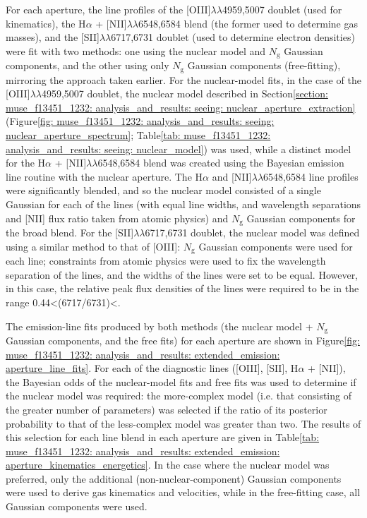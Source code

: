 For each aperture, the line profiles of the [OIII]$\lambda\lambda$4959,5007 doublet (used for kinematics), the H$\alpha$ + {[}NII{]}$\lambda\lambda$6548,6584 blend (the former used to determine gas masses), and the {[}SII{]}$\lambda\lambda$6717,6731 doublet (used to determine electron densities) were fit with two methods: one using the nuclear model and $N_\mathrm{g}$ Gaussian components, and the other using only $N_\mathrm{g}$ Gaussian components (free-fitting), mirroring the approach taken earlier. For the nuclear-model fits, in the case of the [OIII]$\lambda\lambda$4959,5007 doublet, the nuclear model described in Section\;\ref{section: muse_f13451_1232: analysis_and_results: seeing: nuclear_aperture_extraction} (Figure\;\ref{fig: muse_f13451_1232: analysis_and_results: seeing: nuclear_aperture_spectrum}; Table\;\ref{tab: muse_f13451_1232: analysis_and_results: seeing: nuclear_model}) was used, while a distinct model for the H$\alpha$ + {[}NII{]}$\lambda\lambda$6548,6584 blend was created using the Bayesian emission line routine with the nuclear aperture. The H$\alpha$ and {[}NII{]}$\lambda\lambda$6548,6584 line profiles were significantly blended, and so the nuclear model consisted of a single Gaussian for each of the lines (with equal line widths, and wavelength separations and [NII] flux ratio taken from atomic physics) and $N_\mathrm{g}$ Gaussian components for the broad blend. For the {[}SII{]}$\lambda\lambda$6717,6731 doublet, the nuclear model was defined using a similar method to that of [OIII]: $N_\mathrm{g}$ Gaussian components were used for each line; constraints from atomic physics \citep{Osterbrock2006} were used to fix the wavelength separation of the lines, and the widths of the lines were set to be equal. However, in this case, the relative peak flux densities of the lines were required to be in the range 0.44\;\textless\;[SII](6717/6731)\;\textless{}.

The emission-line fits produced by both methods (the nuclear model + $N_\mathrm{g}$ Gaussian components, and the free fits) for each aperture are shown in Figure\;\ref{fig: muse_f13451_1232: analysis_and_results: extended_emission: aperture_line_fits}. For each of the diagnostic lines ([OIII], [SII], H$\alpha$ + [NII]), the Bayesian odds of the nuclear-model fits and free fits was used to determine if the nuclear model was required: the more-complex model (i.e. that consisting of the greater number of parameters) was selected if the ratio of its posterior probability to that of the less-complex model was greater than two. The results of this selection for each line blend in each aperture are given in Table\;\ref{tab: muse_f13451_1232: analysis_and_results: extended_emission: aperture_kinematics_energetics}. In the case where the nuclear model was preferred, only the additional (non-nuclear-component) Gaussian components were used to derive gas kinematics and velocities, while in the free-fitting case, all Gaussian components were used.

